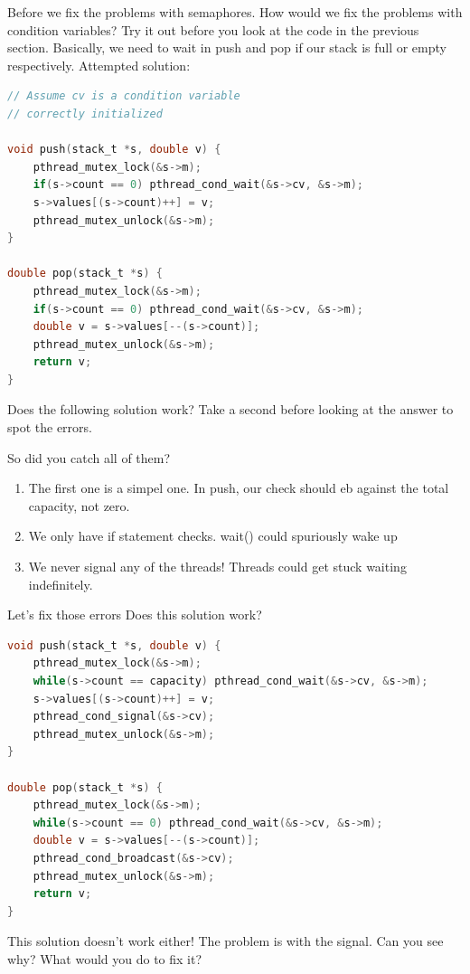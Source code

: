 Before we fix the problems with semaphores.
How would we fix the problems with condition variables?
Try it out before you look at the code in the previous section.
Basically, we need to wait in push and pop if our stack is full or empty respectively.
Attempted solution:

\begin{lstlisting}[language=C]
// Assume cv is a condition variable
// correctly initialized

void push(stack_t *s, double v) {
    pthread_mutex_lock(&s->m);
    if(s->count == 0) pthread_cond_wait(&s->cv, &s->m);
    s->values[(s->count)++] = v;
    pthread_mutex_unlock(&s->m);
}

double pop(stack_t *s) {
    pthread_mutex_lock(&s->m);
    if(s->count == 0) pthread_cond_wait(&s->cv, &s->m);
    double v = s->values[--(s->count)];
    pthread_mutex_unlock(&s->m);
    return v;
}
\end{lstlisting}

Does the following solution work?
Take a second before looking at the answer to spot the errors.

So did you catch all of them?
\begin{enumerate}
\item The first one is a simpel one. In push, our check should eb against the total capacity, not zero.
\item We only have if statement checks. wait() could spuriously wake up
\item We never signal any of the threads! Threads could get stuck waiting indefinitely.
\end{enumerate}

Let's fix those errors
Does this solution work?

\begin{lstlisting}[language=C]
void push(stack_t *s, double v) {
    pthread_mutex_lock(&s->m);
    while(s->count == capacity) pthread_cond_wait(&s->cv, &s->m);
    s->values[(s->count)++] = v;
    pthread_cond_signal(&s->cv);
    pthread_mutex_unlock(&s->m);
}

double pop(stack_t *s) {
    pthread_mutex_lock(&s->m);
    while(s->count == 0) pthread_cond_wait(&s->cv, &s->m);
    double v = s->values[--(s->count)];
    pthread_cond_broadcast(&s->cv);
    pthread_mutex_unlock(&s->m);
    return v;
}
\end{lstlisting}

This solution doesn't work either!
The problem is with the signal.
Can you see why? What would you do to fix it?

